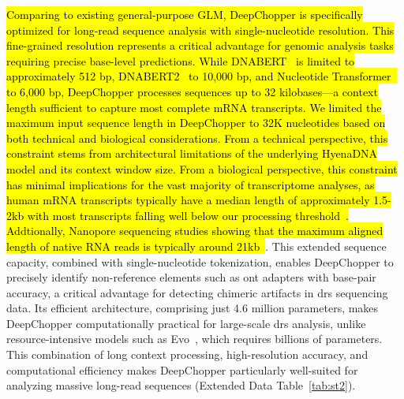 \documentclass[pdflatex,sn-nature, lineno]{sn-jnl}%
\newcommand{\edtableref}[2]{Extended Data Table~\hyperref[#1]{\ref*{#1}#2}}
\begin{document}
\hl{Comparing to existing general-purpose GLM, DeepChopper is specifically optimized for long-read sequence analysis with single-nucleotide resolution.
This fine-grained resolution represents a critical advantage for genomic analysis tasks requiring precise base-level predictions.
While DNABERT\mbox{~\cite{ji2021dnabert}} is limited to approximately 512 bp, DNABERT2\mbox{~\cite{zhou2023dnabert2}} to 10,000 bp, and Nucleotide Transformer\mbox{~\cite{dalla2024nucleotide}} to 6,000 bp, DeepChopper processes sequences up to 32 kilobases—a context length sufficient to capture most complete mRNA transcripts.
We limited the maximum input sequence length in DeepChopper to 32K nucleotides based on both technical and biological considerations.
From a technical perspective, this constraint stems from architectural limitations of the underlying HyenaDNA model and its context window size.
From a biological perspective, this constraint has minimal implications for the vast majority of transcriptome analyses, as human mRNA transcripts typically have a median length of approximately 1.5-2kb with most transcripts falling well below our processing threshold\mbox{~\cite{lopes2021gene}}.
Addtionally, Nanopore sequencing studies showing that the maximum aligned length of native RNA reads is typically around 21kb\mbox{~\cite{workman2019nanopore}}}.
This extended sequence capacity, combined with single-nucleotide tokenization, enables DeepChopper to precisely identify non-reference elements such as \gls{ont} adapters with base-pair accuracy, a critical advantage for detecting chimeric artifacts in \gls{drs} sequencing data.
Its efficient architecture, comprising just 4.6 million parameters, makes DeepChopper computationally practical for large-scale \gls{drs} analysis, unlike resource-intensive models such as Evo~\cite{nguyen2024sequence}, which requires billions of parameters.
This combination of long context processing, high-resolution accuracy, and computational efficiency makes DeepChopper particularly well-suited for analyzing massive long-read sequences (\edtableref{tab:st2}{}).
\end{document}
